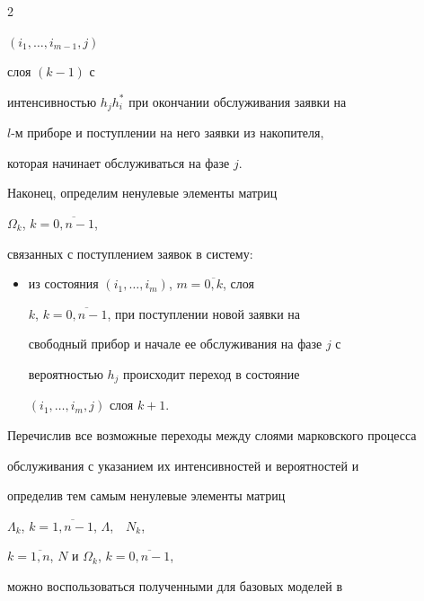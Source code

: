 \begin{multicols}{2}
\begin{itemize}
$\left ( i_1,\ldots,i_{m-1},j\right)$            %


слоя $(k-1)$ с


интенсивностью $h_j h_i^*$ при окончании обслуживания заявки на


$l$-м приборе и поступлении на него заявки из накопителя,


которая начинает обслуживаться на фазе $j$.


\end{itemize}





Наконец, определим ненулевые элементы мат\-риц


$\Omega_k$, $k=\overline{0,n-1}$,


связанных с поступлением заявок в систему:


\begin{itemize}










\item из состояния $(i_1,\ldots,i_m)$, $m=\overline{0,k}$, слоя


$k$, $k=\overline{0,n-1}$, при поступлении новой заявки на


свободный прибор и начале ее обслуживания на фазе $j$ с


вероятностью $h_j$ происходит переход в состояние


$(i_1,\ldots,i_m,j)$ слоя $k+1$.


\end{itemize}





Перечислив все возможные переходы между слоями марковского процесса


обслуживания с указанием их интенсивностей и вероятностей  и


определив тем самым ненулевые элементы матриц


$\Lambda_k$, $k=\overline{1,n-1}$, $\Lambda$,\ \ $N_k$,


$k=\overline{1,n}$, $N$ и $\Omega_k$, $k=\overline{0,n-1}$,


можно воспользоваться полученными для базовых моделей в~\cite{PSC07_1, PC04}



\end{multicols}
